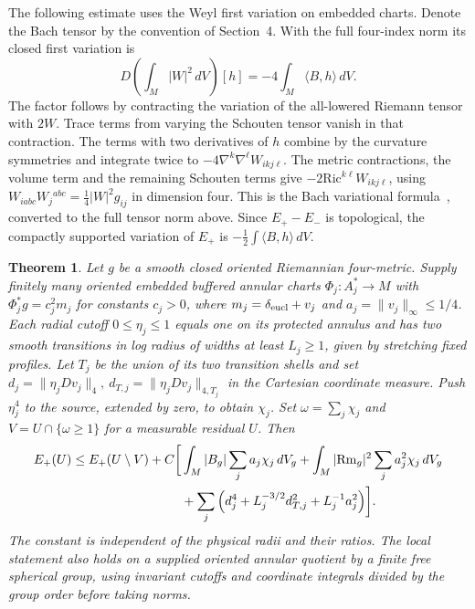 \documentclass[11pt]{article}
\newtheorem{theorem}{Theorem}[section]
\theoremstyle{remark}
\newcommand{\Rm}{\mathrm{Rm}}
\newcommand{\Ric}{\mathrm{Ric}}
\newcommand{\ip}[2]{\langle #1,#2\rangle}
\begin{document}
The following estimate uses the Weyl first variation on embedded charts. Denote the Bach tensor by the convention of Section~4. With the full four-index norm its closed first variation is
\[
 D\!\left(\int_M |W|^2\,dV\right)[h]=-4\int_M\ip{B}{h}\,dV .
\]
The factor follows by contracting the variation of the all-lowered Riemann tensor with \(2W\). Trace terms from varying the Schouten tensor vanish in that contraction. The terms with two derivatives of \(h\) combine by the curvature symmetries and integrate twice to \(-4\nabla^k\nabla^\ell W_{ikj\ell}\). The metric contractions, the volume term and the remaining Schouten terms give \(-2\Ric^{k\ell}W_{ikj\ell}\), using \(W_{iabc}W_j{}^{abc}=\tfrac14 |W|^2g_{ij}\) in dimension four. This is the Bach variational formula~\cite[\S3]{LeBrun2013EinsteinExtremal}, converted to the full tensor norm above. Since \(E_+-E_-\) is topological, the compactly supported variation of \(E_+\) is \(-\frac12\int\ip{B}{h}\,dV\).

\begin{theorem}\label{thm:cover}
Let \(g\) be a smooth closed oriented Riemannian four-metric. Supply finitely many oriented embedded buffered annular charts \(\Phi_j:A_j^*\to M\) with \(\Phi_j^*g=c_j^2m_j\) for constants \(c_j>0\), where \(m_j=\delta_{\rm eucl}+v_j\) and \(a_j=\|v_j\|_\infty\le1/4\). Each radial cutoff \(0\le\eta_j\le1\) equals one on its protected annulus and has two smooth transitions in log radius of widths at least \(L_j\ge1\), given by stretching fixed profiles. Let \(T_j\) be the union of its two transition shells and set \(d_j=\|\eta_j Dv_j\|_4,\ d_{T,j}=\|\eta_j Dv_j\|_{4,T_j}\) in the Cartesian coordinate measure. Push \(\eta_j^4\) to the source, extended by zero, to obtain \(\chi_j\). Set \(\omega=\sum_j\chi_j\) and \(V=U\cap\{\omega\ge 1\}\) for a measurable residual \(U\). Then
\begin{align}
 E_+(U)\le E_+(U\setminus V)+C\biggl[
  &\int_M |B_g|\sum_j a_j\chi_j\,dV_g
     +\int_M|\Rm_g|^2\sum_j a_j^2\chi_j\,dV_g \notag\\
  &+\sum_j\left(d_j^4+ L_j^{-3/2}d_{T,j}^2+L_j^{-1}a_j^2\right)\biggr].
 \label{eq:bachcover}
\end{align}
The constant is independent of the physical radii and their ratios. The local statement also holds on a supplied oriented annular quotient by a finite free spherical group, using invariant cutoffs and coordinate integrals divided by the group order before taking norms.
\end{theorem}
\end{document}
